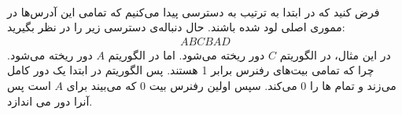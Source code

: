 \\\noindent
فرض کنید که در ابتدا به ترتیب به
دسترسی پیدا می‌کنیم که تمامی این آدرس‌ها در مموری اصلی لود شده باشند.
حال دنباله‌ی دسترسی زیر را در نظر بگیرید:
\begin{gather*}
    ABCBAD
\end{gather*}
در این مثال، در الگوریتم
$C$
دور ریخته می‌شود. اما در الگوریتم
$A$
دور ریخته می‌شود. چرا که تمامی بیت‌های رفنرس برابر 1 هستند. پس الگوریتم در ابتدا یک دور کامل می‌زند و تمام
ها
را 0 می‌کند. سپس اولین رفنرس بیت 0 که می‌بیند برای
$A$
است پس آنرا دور می ‌اندازد.
